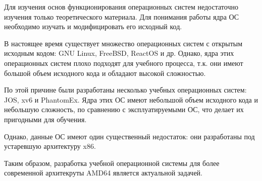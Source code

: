 \Introduction

Для изучения основ функционирования операционных систем недостаточно
изучения только теоретического материала. Для понимания работы ядра
ОС необходимо изучать и модифицировать его исходный код.

В настоящее время существует множество операционных систем с открытым
исходным кодом: GNU Linux, FreeBSD, ReactOS и др. Однако, ядра этих
операционных систем плохо подходят для учебного процесса, т.к. они
имеют большой объем исходного кода и обладают высокой сложностью.

По этой причине были разработаны несколько учебных операционных
систем: JOS, xv6 и PhantomEx. Ядра этих ОС имеют небольшой объем
исходного кода и небольшую сложность, по сравнению с
эксплуатируемыми ОС, что делает их пригодными для обучения.

Однако, данные ОС имеют один существенный недостаток: они разработаны
под устаревшую архитектуру x86.

Таким образом, разработка учебной операционной системы для более современной
архитекруты AMD64 является актуальной задачей.
